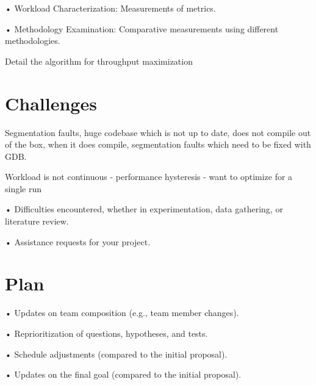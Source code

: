 \documentclass[12pt]{article}
\begin{document}
• Workload Characterization: Measurements of metrics.

• Methodology Examination: Comparative measurements using different methodologies.

\singlespacing
Detail the algorithm for throughput maximization

\section{Challenges}

Segmentation faults, huge codebase which is not up to date, does not compile out of the box, when it does compile, segmentation faults which need to be fixed with GDB.

Workload is not continuous - performance hysteresis - want to optimize for a single run

• Difficulties encountered, whether in experimentation, data gathering, or literature review.

• Assistance requests for your project.
\section{Plan}

• Updates on team composition (e.g., team member changes).

• Reprioritization of questions, hypotheses, and tests.

• Schedule adjustments (compared to the initial proposal).

• Updates on the final goal (compared to the initial proposal).


%
%
\end{document}
